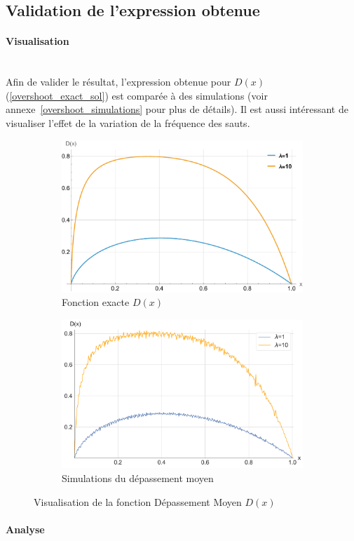 \subsection{Validation de l'expression obtenue}
\paragraph{Visualisation}\phantom{}\\
Afin de valider le résultat, l'expression obtenue pour $D(x)$ (\ref{overshoot_exact_sol}) est comparée à des simulations (voir annexe~\ref{overshoot_simulations} pour plus de détails). Il est aussi intéressant de visualiser l'effet de la variation de la fréquence des sauts.
\begin{figure}[htb]
    \centering
    \begin{subfigure}{0.49\linewidth}
        \includegraphics[width=\linewidth]{img/validation/Ovs/lambda.pdf}
        \caption{Fonction exacte $D(x)$}\label{fig:OvershootLambda}
    \end{subfigure}
    \hfill
    \begin{subfigure}{0.49\linewidth}
        \includegraphics[width=\linewidth]{img/validation/Ovs/simulation_lambda.pdf}
        \caption{Simulations du dépassement moyen}\label{fig:OvershootSimulationLambda}
    \end{subfigure}
    \caption{Visualisation de la fonction Dépassement Moyen \(D(x)\)}\label{fig:OvershootSensibility}
\end{figure}\FloatBarrier\paragraph{Analyse}\phantom{}\\
